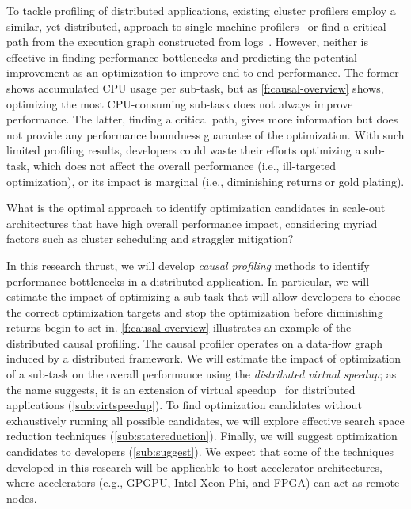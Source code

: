 To tackle profiling of distributed applications, existing cluster
profilers employ a similar, yet distributed, approach to single-machine
profilers~\cite{spark:web, cluster:web} or find a critical path from
the execution graph constructed from logs~\cite{yang:critical-path,
aguilera:dist-system-blackboxes}.
However, neither is effective in
finding performance bottlenecks and predicting the potential improvement as an
optimization to improve end-to-end performance.
The former shows accumulated CPU usage per sub-task, but
as \autoref{f:causal-overview} shows, optimizing the most
CPU-consuming sub-task does not always improve performance.
The latter, finding a critical path, gives more information 
but does not provide any performance boundness guarantee of the optimization.
With such limited profiling results, developers
could waste their efforts optimizing a sub-task, which does not
affect the overall performance (i.e., ill-targeted optimization), or
its impact is marginal (i.e., diminishing returns or gold plating).

\boxbeg
\begin{Challenge}
  What is the optimal approach to identify optimization candidates in
  scale-out architectures that have high overall performance impact,
  considering myriad factors such as cluster scheduling and straggler
  mitigation?
\end{Challenge}
\boxend

In this research thrust, we will develop {\em causal profiling}
methods to identify performance bottlenecks in a distributed
application. In particular, we will estimate the impact of
optimizing a sub-task that will allow developers to choose the correct
optimization targets and stop the optimization before diminishing
returns begin to set in. \autoref{f:causal-overview} illustrates an
example of the distributed causal profiling. The causal profiler operates
on a data-flow graph induced by a distributed framework.
We will estimate the impact of optimization of
a sub-task on the overall performance using the {\em distributed virtual
speedup}; as the name suggests, it is an extension of
virtual speedup~\cite{curtsinger:coz} for distributed
applications (\autoref{sub:virtspeedup}). To find optimization
candidates without exhaustively running all possible candidates, we will
explore effective search space reduction techniques
(\autoref{sub:statereduction}). Finally, we will suggest optimization
candidates to developers (\autoref{sub:suggest}). We expect that some
of the techniques developed in this research will be applicable to
host-accelerator architectures, where accelerators (e.g., GPGPU, Intel
Xeon Phi, and FPGA) can act as remote nodes.


